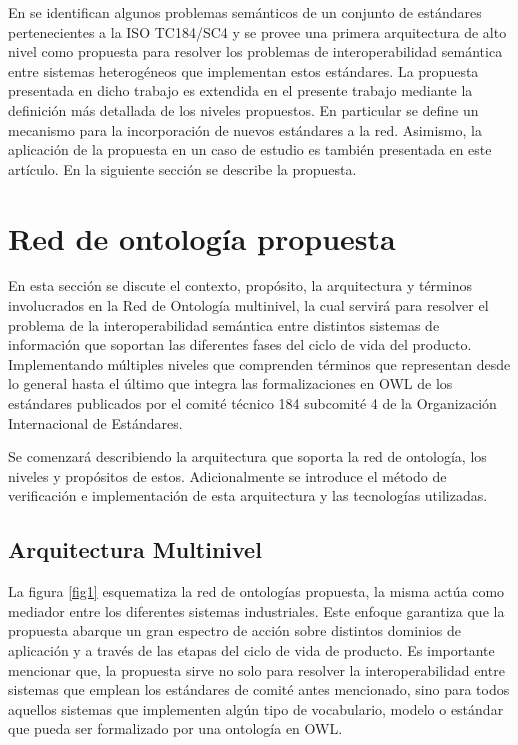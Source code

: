 \documentclass[journal]{IEEEtran}
\begin{document}
En \cite{Fraga} se identifican algunos problemas sem\'anticos de un conjunto de est\'andares pertenecientes a la ISO TC184/SC4 y se provee una primera arquitectura de alto nivel como propuesta para resolver los problemas de interoperabilidad sem\'antica entre sistemas heterog\'eneos que implementan estos est\'andares. La propuesta presentada en dicho trabajo es extendida en el presente trabajo mediante la definici\'on m\'as detallada de los niveles propuestos. En particular se define un mecanismo para la incorporaci\'on de nuevos est\'andares a la red. Asimismo, la aplicaci\'on de la propuesta en un caso de estudio es tambi\'en presentada en este art\'iculo. En la siguiente secci\'on se describe la propuesta.


\section{Red de ontolog\'ia propuesta}

En esta secci\'on se discute el contexto, prop\'osito, la arquitectura y t\'erminos involucrados en la Red de Ontolog\'ia multinivel, la cual servir\'a para resolver el problema de la interoperabilidad sem\'antica entre distintos sistemas de informaci\'on que soportan las diferentes fases del ciclo de vida del producto. Implementando m\'ultiples niveles que comprenden t\'erminos que representan desde lo general hasta el \'ultimo que integra las formalizaciones en OWL de los est\'andares publicados por el comit\'e t\'ecnico 184 subcomit\'e 4 de la Organizaci\'on Internacional de Est\'andares. 

Se comenzar\'a describiendo la arquitectura que soporta la red de ontolog\'ia, los niveles y prop\'ositos de estos. Adicionalmente se introduce el m\'etodo de verificaci\'on e implementaci\'on de esta arquitectura y las tecnolog\'ias utilizadas.


\subsection{Arquitectura Multinivel}

La figura \ref{fig1} esquematiza la red de ontolog\'ias propuesta, la misma act\'ua como mediador entre los diferentes sistemas industriales. Este enfoque garantiza que la propuesta abarque un gran espectro de acci\'on sobre distintos dominios de aplicaci\'on y a trav\'es de las etapas del ciclo de vida de producto. Es importante mencionar que, la propuesta sirve no solo para resolver la interoperabilidad entre sistemas que emplean los est\'andares de comit\'e antes mencionado, sino para todos aquellos sistemas que implementen alg\'un tipo de vocabulario, modelo o est\'andar que pueda ser formalizado por una ontolog\'ia en OWL. 
\end{document}
